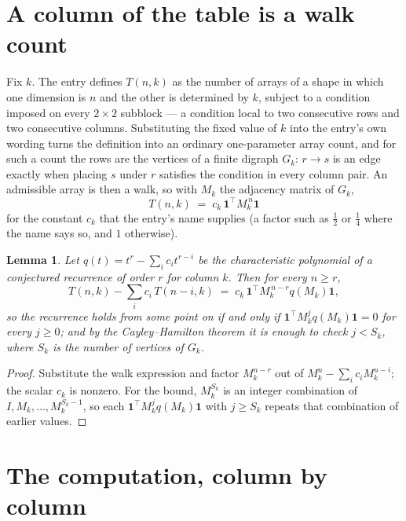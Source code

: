 \documentclass[11pt,a4paper]{article}
\theoremstyle{plain}
\newtheorem{lemma}[theorem]{Lemma}
\theoremstyle{definition}
\begin{document}
\section{A column of the table is a walk count}

Fix $k$. The entry defines $T(n,k)$ as the number of arrays of a shape in which one dimension
is $n$ and the other is determined by $k$, subject to a condition imposed on every
$2\times2$ subblock --- a condition local to two consecutive rows and two consecutive columns.
Substituting the fixed value of $k$ into the entry's own wording turns the definition into an
ordinary one-parameter array count, and for such a count the rows are the vertices of a finite
digraph $G_k$: $r\to s$ is an edge exactly when placing $s$ under $r$ satisfies the condition
in every column pair. An admissible array is then a walk, so with $M_k$ the adjacency matrix
of $G_k$,
\[
T(n,k)\;=\;c_k\,\mathbf{1}^{\!\top}M_k^{\,n}\mathbf{1}
\]
for the constant $c_k$ that the entry's name supplies (a factor such as $\tfrac12$ or
$\tfrac14$ where the name says so, and $1$ otherwise).

\begin{lemma}\label{lem:crit}
Let $q(t)=t^{r}-\sum_i c_it^{r-i}$ be the characteristic polynomial of a conjectured
recurrence of order $r$ for column $k$. Then for every $n\ge r$,
\[
T(n,k)-\sum_i c_i\,T(n-i,k)\;=\;c_k\,\mathbf{1}^{\!\top}M_k^{\,n-r}q(M_k)\mathbf{1},
\]
so the recurrence holds from some point on if and only if
$\mathbf{1}^{\!\top}M_k^{j}q(M_k)\mathbf{1}=0$ for every $j\ge0$; and by the
Cayley--Hamilton theorem it is enough to check $j<S_k$, where $S_k$ is the number of vertices
of $G_k$.
\end{lemma}

\begin{proof}
Substitute the walk expression and factor $M_k^{n-r}$ out of $M_k^{n}-\sum_ic_iM_k^{n-i}$;
the scalar $c_k$ is nonzero. For the bound, $M_k^{S_k}$ is an integer combination of
$I,M_k,\dots,M_k^{S_k-1}$, so each $\mathbf{1}^{\!\top}M_k^{j}q(M_k)\mathbf{1}$ with
$j\ge S_k$ repeats that combination of earlier values.
\end{proof}

\section{The computation, column by column}
\end{document}
